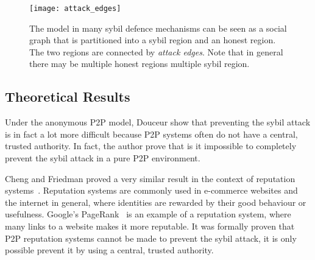 \begin{figure}
  \centering
  \texttt{[image: attack\_edges]}
  \caption{The model in many sybil defence mechanisms can be seen as a social
    graph that is partitioned into a sybil region and an honest region. The two
    regions are connected by \emph{attack edges}. Note that in general there may
    be multiple honest regions multiple sybil region. }
  \label{fig:attack-edge}
\end{figure}

\subsection{Theoretical Results}\label{sec:sybil-theory}
Under the anonymous P2P model, Douceur show that preventing the sybil attack is
in fact a lot more difficult because P2P systems often do not have a central,
trusted authority. In fact, the author prove that is it impossible to completely
prevent the sybil attack in a pure P2P environment.

Cheng and Friedman proved a very similar result in the context of reputation
systems~\cite{cheng2005sybilproof}. Reputation systems are commonly used in
e-commerce websites and the internet in general, where identities are rewarded
by their good behaviour or usefulness. Google's PageRank~\cite{page1999pagerank}
is an example of a reputation system, where many links to a website makes it
more reputable. It was formally proven that P2P reputation systems cannot be
made to prevent the sybil attack, it is only possible prevent it by using a
central, trusted authority.


